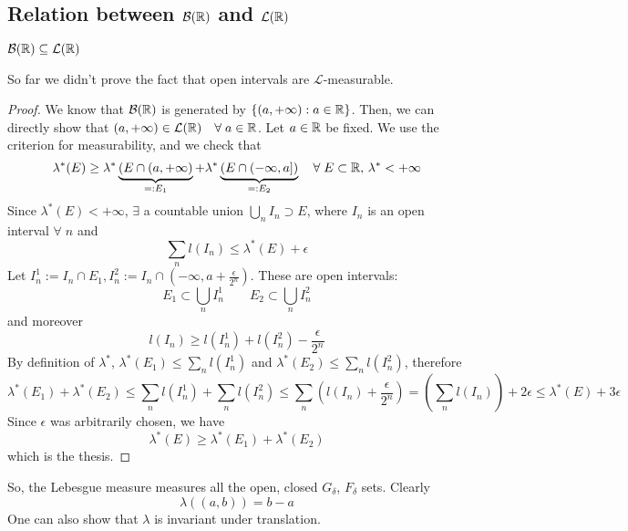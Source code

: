 \subsection{Relation between \texorpdfstring{\(\mathcal{B}(\mathbb{R})\)}{B(R)} and \texorpdfstring{\(\mathcal{L}(\mathbb{R})\)}{L(R)}}
\begin{proposition}
    \(\mathcal{B}(\mathbb{R}) \subseteq \mathcal{L}(\mathbb{R})\)
\end{proposition}
\begin{remark}
    So far we didn't prove the fact that open intervals are \(\mathcal{L}\)-measurable.
\end{remark}
\begin{proof}
    We know that \(\mathcal{B}(\mathbb{R})\) is generated by \(\left\lbrace (a, +\infty) : a \in \mathbb{R} \right\rbrace\). Then, we can directly show that \((a, +\infty) \in \mathcal{L}(\mathbb{R}) \quad \forall \; a \in \mathbb{R}\). Let \(a \in \mathbb{R}\) be fixed. We use the criterion for measurability, and we check that 
    \[
        \lambda^* (E) \geq \lambda^*\underbrace{(E \cap (a, +\infty)}_{=: E_1} + \lambda^*\underbrace{(E \cap (-\infty, a])}_{=:E_2} \quad \forall\; E \subset \mathbb{R}, \, \lambda^* < +\infty
    \]
    Since \(\lambda^*(E) < +\infty\), \(\exists\) a countable union \(\bigcup_n I_n \supset E\), where \(I_n\) is an open interval \(\forall \; n\) and 
    \[
        \sum_n l(I_n) \leq \lambda^*(E) + \epsilon
    \]
    Let \(I^1_n := I_n \cap E_1, I^2_n := I_n \cap (-\infty, a + \frac{\epsilon}{2^n})\). These are open intervals:
    \[
        E_1 \subset \bigcup_n I^1_n \qquad E_2 \subset \bigcup_n I^2_n
    \tag*{countable unions}\]
    and moreover 
    \[
        l(I_n) \geq l(I^1_n) + l(I^2_n) - \frac{\epsilon}{2^n}
    \]
    By definition of \(\lambda^*\), \(\lambda^*(E_1) \leq \sum_n l(I^1_n)\) and \(\lambda^* (E_2) \leq \sum_n l(I^2_n)\), therefore 
    \[
        \lambda^*(E_1) + \lambda^*(E_2) \leq \sum_n l(I^1_n) + \sum_n l(I^2_n) \leq \sum_n \left(l(I_n) +\frac{\epsilon}{2^n}\right) = \left(\sum_n l(I_n)\right) + 2\epsilon \leq \lambda^*(E) + 3\epsilon
    \]
    Since \(\epsilon\) was arbitrarily chosen, we have
    \[
        \lambda^*(E) \geq \lambda^*(E_1) + \lambda^*(E_2)
    \]  
    which is the thesis.
\end{proof}
So, the Lebesgue measure measures all the open, closed \(G_{\delta}\), \(F_{\delta}\) sets. Clearly
\[
    \lambda((a,b)) = b-a
\]
One can also show that \(\lambda\) is invariant under translation. 


